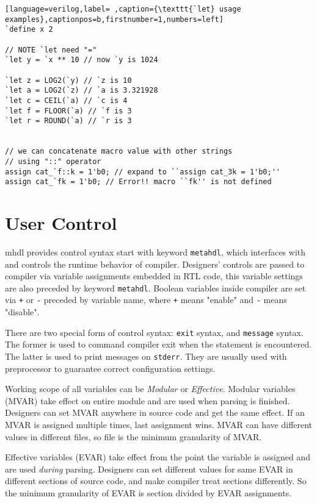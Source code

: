 \documentclass[10pt,oneside]{book}
\begin{document}
\begin{lstlisting}[language=verilog,label= ,caption={\texttt{`let} usage examples},captionpos=b,firstnumber=1,numbers=left]
`define x 2

// NOTE `let need "="
`let y = `x ** 10 // now `y is 1024

`let z = LOG2(`y) // `z is 10
`let a = LOG2(`z) // `a is 3.321928
`let c = CEIL(`a) // `c is 4
`let f = FLOOR(`a) // `f is 3
`let r = ROUND(`a) // `r is 3


// we can concatenate macro value with other strings
// using "::" operator
assign cat_`f::k = 1'b0; // expand to ``assign cat_3k = 1'b0;''
assign cat_`fk = 1'b0; // Error!! macro ``fk'' is not defined
\end{lstlisting}

\chapter{User Control}
\label{sec:org17bead1}
mhdl provides control syntax start with keyword \texttt{metahdl}, which
interfaces with and controls the runtime behavior of compiler.
Designers' controls are passed to compiler via variable assignments
embedded in RTL code, this variable settings are also preceded by
keyword \texttt{metahdl}.  Boolean variables inside compiler are set via \texttt{+}
or \texttt{-} preceded by variable name, where \texttt{+} means "enable" and \texttt{-}
means "disable".

There are two special form of control syntax: \texttt{exit} syntax, and
\texttt{message} syntax.  The former is used to command compiler exit when
the statement is encountered.  The latter is used to print messages on
\texttt{stderr}.  They are usually used with preprocessor to guarantee
correct configuration settings.  

Working scope of all variables can be \emph{Modular} or \emph{Effective}.
Modular variables (MVAR) take effect on entire module and are used
when parsing is finished.  Designers can set MVAR anywhere in source
code and get the same effect.  If an MVAR is assigned multiple times,
last assignment wins.  MVAR can have different values in different
files, so file is the minimum granularity of MVAR.

Effective variables (EVAR) take effect from the point the variable is
assigned and are used \emph{during} parsing.  Designers can set different
values for same EVAR in different sections of source code, and make
compiler treat sections differently.  So the minimum granularity of
EVAR is section divided by EVAR assignments.
\end{document}
